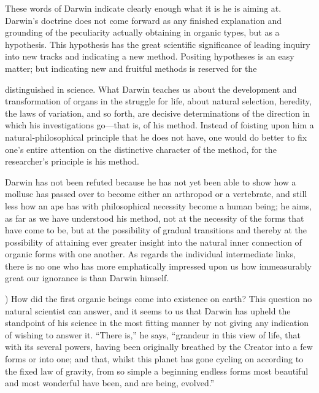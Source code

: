 \documentclass[12pt,a4paper]{article}
\begin{document}
These words of Darwin indicate clearly enough what it is he is aiming
at. Darwin's doctrine does not come forward as any finished
explanation and grounding of the peculiarity actually obtaining in
organic types, but as a hypothesis. This hypothesis has the great
scientific significance of leading inquiry into new tracks and
indicating a new method. Positing hypotheses is an easy matter; but
indicating new and fruitful methods is reserved for the

distinguished in science. What Darwin teaches us about the development
and transformation of organs in the struggle for life, about natural
selection, heredity, the laws of variation, and so forth, are decisive
determinations of the direction in which his investigations go---that
is, of his method. Instead of foisting upon him a natural-philosophical
principle that he does not have, one would do better to fix one's
entire attention on the distinctive character of the method, for the
researcher's principle is his method.

Darwin has not been refuted because he has not yet been able to show
how a mollusc has passed over to become either an arthropod or a
vertebrate, and still less how an ape has with philosophical necessity
become a human being; he aims, as far as we have understood his
method, not at the necessity of the forms that have come to be, but
at the possibility of gradual transitions and thereby at the
possibility of attaining ever greater insight into the natural inner
connection of organic forms with one another. As regards the
individual intermediate links, there is no one who has more
emphatically impressed upon us how immeasurably great our ignorance is
than Darwin himself.

\medskip

) How did the first organic beings come into existence on
earth? This question no natural scientist can answer, and it seems to
us that Darwin has upheld the standpoint of his science in the most
fitting manner by not giving any indication of wishing to answer it.
``There is,'' he says, ``grandeur in this view of life, that with its
several powers, having been originally breathed by the Creator into a
few forms or into one; and that, whilst this planet has gone cycling
on according to the fixed law of gravity, from so simple a beginning
endless forms most beautiful and most wonderful have been, and are
being, evolved.''
\end{document}
